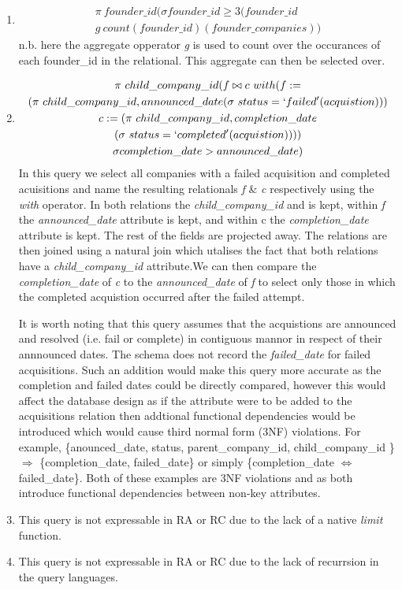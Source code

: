 \documentclass[12pt]{article}
\begin{document}
\begin{enumerate}
  \item\label{part1}\begin{multline} \pi \ founder\_id (\sigma founder\_id \geq 3 (founder\_id \ \\
  g \ count (founder\_id) (founder\_companies))
 \end{multline}
 n.b. here the aggregate opperator \emph{g} is used to count over the occurances of each founder\_id in the relational. This aggregate can then be selected over.
  \item\label{part1}\begin{multline}
  \pi \ child\_company\_id (f \bowtie c \ with (f := \\
  (\pi \ child\_company\_id, announced\_date (\sigma \ status = `failed' (acquistion))) \\
  c := (\pi \ child\_company\_id, completion\_date \\
  (\sigma \ status = `completed' (acquistion)))
  ) \\
  \sigma completion\_date > announced\_date)
 \end{multline}
 In this query we select all companies with a failed acquisition and completed acuisitions and name the resulting relationals \emph{f} \& \emph{c} respectively using the \emph{with} operator. In both relations the \emph{child\_company\_id} and is kept, within \emph{f} the \emph{announced\_date} attribute is kept, and within {c} the \emph{completion\_date} attribute is kept. The rest of the fields are projected away. The relations are then joined using a natural join which utalises the fact that both relations have a \emph{child\_company\_id} attribute.We can then compare the \emph{completion\_date} of \emph{c} to the \emph{announced\_date} of \emph{f} to select only those in which the completed acquistion occurred after the failed attempt.

 It is worth noting that this query assumes that the acquistions are announced and resolved (i.e. fail or complete) in contiguous mannor in respect of their annnounced dates. The schema does not record the \emph {failed\_date} for failed acquisitions. Such an addition would make this query more accurate as the completion and failed dates could be directly compared, however this would affect the database design as if the attribute were to be added to the acquisitions relation then addtional functional dependencies would be introduced which would cause third normal form (3NF) violations. For example, \{{anounced\_date, status, parent\_company\_id, child\_company\_id }\} $\Rightarrow$ \{{completion\_date, failed\_date}\} or simply \{{completion\_date $\Leftrightarrow$ failed\_date}\}. Both of these examples are 3NF violations and as both introduce functional dependencies between non-key attributes.

  \item\label{part1} This query is not expressable in RA or RC due to the lack of a native \emph{limit} function.
  \item\label{part1} This query is not expressable in RA or RC due to the lack of recurrsion in the query languages.
  \end{enumerate}
\end{document}
